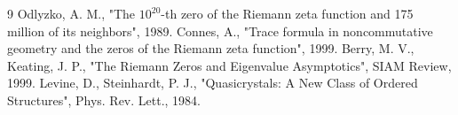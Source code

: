 \documentclass[11pt, a4paper]{article}
\begin{document}
	\begin{thebibliography}{9}
		Odlyzko, A. M., "The $10^{20}$-th zero of the Riemann zeta function and 175 million of its neighbors", 1989.
		Connes, A., "Trace formula in noncommutative geometry and the zeros of the Riemann zeta function", 1999.
		Berry, M. V., Keating, J. P., "The Riemann Zeros and Eigenvalue Asymptotics", SIAM Review, 1999.
		Levine, D., Steinhardt, P. J., "Quasicrystals: A New Class of Ordered Structures", Phys. Rev. Lett., 1984.
	\end{thebibliography}
	
\end{document}
